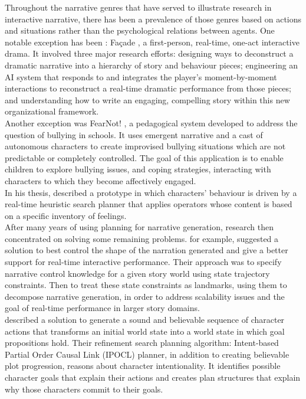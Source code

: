 \documentclass[11pt]{article}
\begin{document}
Throughout the narrative genres that have served to illustrate research in interactive narrative, there has been a prevalence of those genres based on actions and situations rather than the psychological relations between agents. One notable exception has been : Fa\c cade \citep{Mateas05}, a first-person, real-time, one-act interactive drama. It involved three major research efforts: designing ways to deconstruct a dramatic narrative into a hierarchy of story and behaviour pieces; engineering an AI system that responds to and integrates the player’s moment-by-moment interactions to reconstruct a real-time dramatic performance from those pieces; and understanding how to write an engaging, compelling story within this new organizational framework.\\

Another exception was FearNot! \citep{Aylett05}, a pedagogical system developed to address the question of bullying in schools. It uses emergent narrative and a cast of autonomous characters to create improvised bullying situations which are not predictable or completely controlled. The goal of this application is to enable children to explore bullying issues, and coping strategies, interacting with characters to which they become affectively engaged.\\

In his thesis, \citeauthor{Pizzi11} described a prototype in which characters’ behaviour is driven by a real-time heuristic search planner that applies operators whose content is based on a specific inventory of feelings.\\

After many years of using planning for narrative generation, research then concentrated on solving some remaining problems. \citeauthor{Porteous10} for example, suggested a solution to best control the shape of the narration generated and give a better support for real-time interactive performance. Their approach was to specify narrative control knowledge for a given story world using state trajectory constraints. Then to treat these state constraints as landmarks, using them to decompose narrative generation, in order to address scalability issues and the goal of real-time performance in larger story domains.\\

\citeauthor{Riedl10} described a solution to generate a sound and believable sequence of character actions that transforms an initial world state into a world state in which goal propositions hold. Their refinement search planning algorithm: Intent-based Partial Order Causal Link (IPOCL) planner, in addition to creating believable plot progression, reasons about character intentionality. It identifies possible character goals that explain their actions and creates plan structures that explain why those characters commit to their goals.\\
\end{document}
